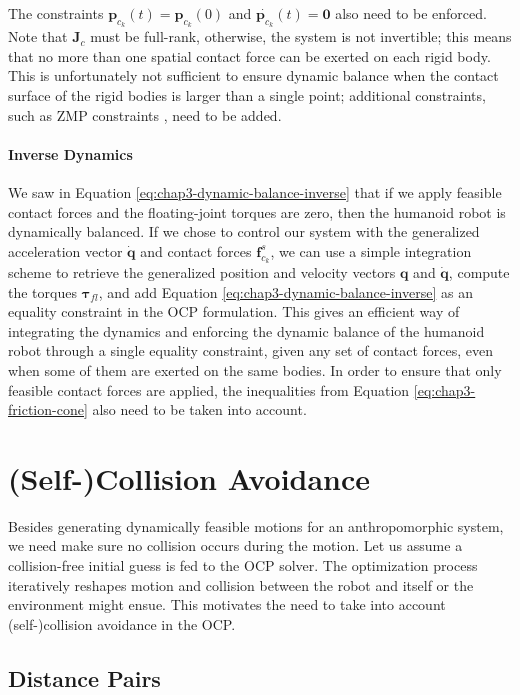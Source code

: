 The constraints $\mathbf{p}_{c_k}(t)=\mathbf{p}_{c_k}(0)$ and
$\dot{\mathbf{p}_{c_k}}(t)=\mathbf{0}$ also need to be enforced. Note
that $\mathbf{J}_{c}$ must be full-rank, otherwise, the system is not
invertible; this means that no more than one spatial contact force can
be exerted on each rigid body. This is unfortunately not sufficient to
ensure dynamic balance when the contact surface of the rigid bodies is
larger than a single point; additional constraints, such as ZMP
constraints \cite{koch2012optimization}, need to be added.

\paragraph{Inverse Dynamics}

We saw in Equation \ref{eq:chap3-dynamic-balance-inverse} that if we
apply feasible contact forces and the floating-joint torques are zero,
then the humanoid robot is dynamically balanced. If we chose to
control our system with the generalized acceleration vector
$\mathbf{\dot{q}}$ and contact forces $\mathbf{f}^s_{c_k}$, we can use
a simple integration scheme to retrieve the generalized position and
velocity vectors $\mathbf{q}$ and $\mathbf{\dot{q}}$, compute the
torques $\boldsymbol{\tau}_{fl}$, and add Equation
\ref{eq:chap3-dynamic-balance-inverse} as an equality constraint in
the OCP formulation. This gives an efficient way of integrating the
dynamics and enforcing the dynamic balance of the humanoid robot
through a single equality constraint, given any set of contact forces,
even when some of them are exerted on the same bodies. In order to
ensure that only feasible contact forces are applied, the inequalities
from Equation \ref{eq:chap3-friction-cone} also need to be taken into
account.

\section{(Self-)Collision Avoidance}
\label{sec:chap3-collision-avoidance}

Besides generating dynamically feasible motions for an anthropomorphic
system, we need make sure no collision occurs during the motion. Let
us assume a collision-free initial guess is fed to the OCP solver. The
optimization process iteratively reshapes motion and collision between
the robot and itself or the environment might ensue. This motivates
the need to take into account (self-)collision avoidance in the OCP.

\subsection{Distance Pairs}


